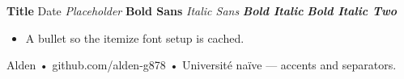 \documentclass[10pt,letterpaper]{article}
\begin{document}
\selectfont
\textbf{Title} \textsf{Date} \textit{Placeholder}
\textbf{\textsf{Bold Sans}} \textit{\textsf{Italic Sans}}
\textbf{\textit{Bold Italic}} \textbf{\itshape Bold Italic Two}

\begin{itemize}
  \item A bullet so the itemize font setup is cached.
\end{itemize}

Alden • github.com/alden-g878 • Universit\'e na\"ive — accents and separators.
\end{document}
